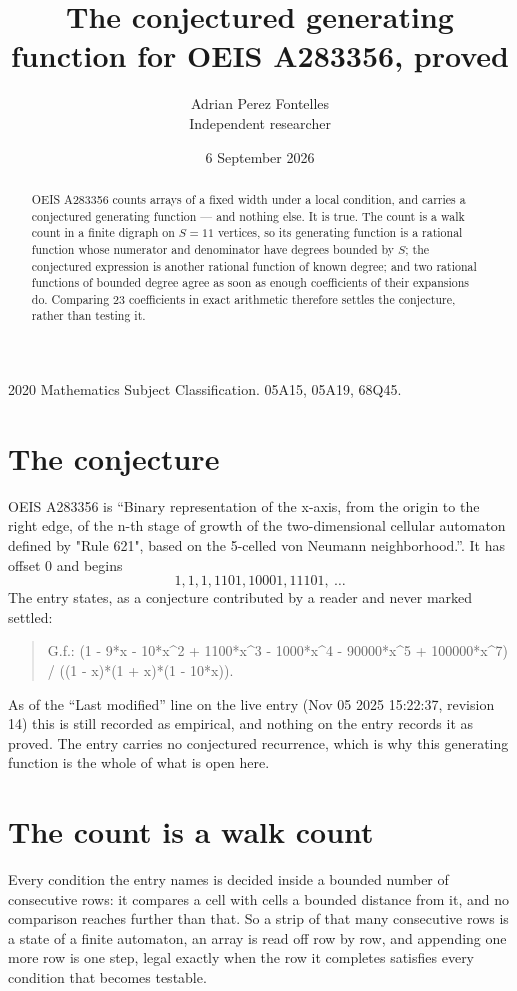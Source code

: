 \documentclass[11pt,a4paper]{article}
\title{The conjectured generating function for OEIS A283356, proved}
\author{Adrian Perez Fontelles\\ \small Independent researcher}
\date{6 September 2026}
\theoremstyle{plain}
\theoremstyle{definition}
\begin{document}
\maketitle

\begin{abstract}
OEIS A283356 counts arrays of a fixed width under a local condition, and carries a conjectured
generating function --- and nothing else. It is true. The count is a walk count in a finite
digraph on $S=11$ vertices, so its generating function is a rational function whose numerator
and denominator have degrees bounded by $S$; the conjectured expression is another rational
function of known degree; and two rational functions of bounded degree agree as soon as enough
coefficients of their expansions do. Comparing $23$ coefficients in exact arithmetic
therefore settles the conjecture, rather than testing it.
\end{abstract}

\noindent\small 2020 Mathematics Subject Classification. 05A15, 05A19, 68Q45.\normalsize

\section{The conjecture}

OEIS A283356 is ``Binary representation of the x-axis, from the origin to the right edge, of the n-th stage of growth of the two-dimensional cellular automaton defined by "Rule 621", based on the 5-celled von Neumann neighborhood.''. It has offset $0$ and begins
\[
1, 1, 1, 1101, 10001, 11101,\ \dots
\]
The entry states, as a conjecture contributed by a reader and never marked settled:
\begin{quote}
G.f.: (1 - 9*x - 10*x\^{}2 + 1100*x\^{}3 - 1000*x\^{}4 - 90000*x\^{}5 + 100000*x\^{}7) / ((1 - x)*(1 + x)*(1 - 10*x)).
\end{quote}
As of the ``Last modified'' line on the live entry (Nov 05 2025 15:22:37, revision 14) this is still
recorded as empirical, and nothing on the entry records it as proved. The entry carries no
conjectured recurrence, which is why this generating function is the whole of what is open
here.

\section{The count is a walk count}

Every condition the entry names is decided inside a bounded number of consecutive rows: it
compares a cell with cells a bounded distance from it, and no comparison reaches further than
that. So a strip of that many consecutive rows is a state of a finite automaton, an array is
read off row by row, and appending one more row is one step, legal exactly when the row it
completes satisfies every condition that becomes testable.
\end{document}
